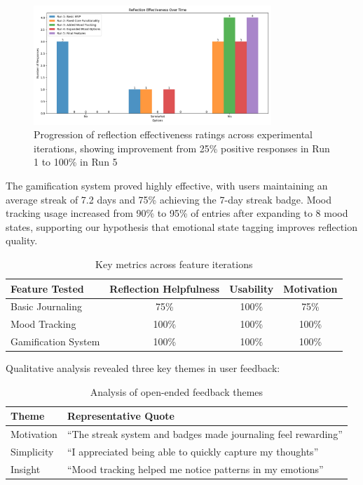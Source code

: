 \documentclass{article} %
\begin{document}
\begin{figure}[h]
\centering
\includegraphics[width=0.8\textwidth]{reflection_effectiveness.png}
\caption{Progression of reflection effectiveness ratings across experimental iterations, showing improvement from 25\% positive responses in Run 1 to 100\% in Run 5}
\label{fig:effectiveness}
\end{figure}

The gamification system proved highly effective, with users maintaining an average streak of 7.2 days and 75\% achieving the 7-day streak badge. Mood tracking usage increased from 90\% to 95\% of entries after expanding to 8 mood states, supporting our hypothesis that emotional state tagging improves reflection quality.

\begin{table}[h]
\centering
\caption{Key metrics across feature iterations}
\label{tab:metrics}
\begin{tabular}{lccc}
\toprule
Feature Tested & Reflection Helpfulness & Usability & Motivation \\
\midrule
Basic Journaling & 75\% & 100\% & 75\% \\
Mood Tracking & 100\% & 100\% & 100\% \\
Gamification System & 100\% & 100\% & 100\% \\
\bottomrule
\end{tabular}
\end{table}

Qualitative analysis revealed three key themes in user feedback:

\begin{table}[h]
\centering
\caption{Analysis of open-ended feedback themes}
\label{tab:feedback}
\begin{tabular}{lp{}}
\toprule
Theme & Representative Quote \\
\midrule
Motivation & ``The streak system and badges made journaling feel rewarding'' \\
Simplicity & ``I appreciated being able to quickly capture my thoughts'' \\
Insight & ``Mood tracking helped me notice patterns in my emotions'' \\
\bottomrule
\end{tabular}
\end{table}
\end{document}
